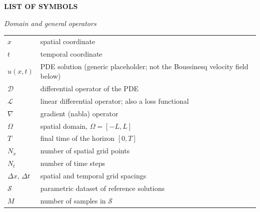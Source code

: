 \pagebreak

\begin{center}
\textbf{LIST OF SYMBOLS}
\end{center}
{}

\vspace{0.4cm}
\noindent\textit{Domain and general operators}\\[2pt]
\noindent
\begin{tabular}{@{}p{3.4cm}p{12cm}@{}}
    $x$              & spatial coordinate \\[2pt]
    $t$              & temporal coordinate \\[2pt]
    $u(x,t)$         & PDE solution (generic placeholder; not the Boussinesq velocity field below) \\[2pt]
    $\mathcal{D}$    & differential operator of the PDE \\[2pt]
    $\mathcal{L}$    & linear differential operator; also a loss functional \\[2pt]
    $\nabla$         & gradient (nabla) operator \\[2pt]
    $\Omega$         & spatial domain, $\Omega = [-L, L]$ \\[2pt]
    $T$              & final time of the horizon $[0, T]$ \\[2pt]
    $N_x$            & number of spatial grid points \\[2pt]
    $N_t$            & number of time steps \\[2pt]
    $\Delta x,\,\Delta t$ & spatial and temporal grid spacings \\[2pt]
    $\mathcal{S}$    & parametric dataset of reference solutions \\[2pt]
    $M$              & number of samples in $\mathcal{S}$ \\
\end{tabular}

